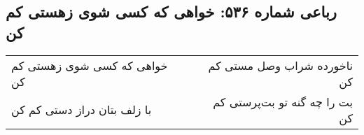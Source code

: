 \begin{center}
\section*{رباعی شماره ۵۳۶: خواهی که کسی شوی زهستی کم کن}
\label{sec:sh536}
\begin{longtable}{l p{0.5cm} r}
خواهی که کسی شوی زهستی کم کن
&&
ناخورده شراب وصل مستی کم کن
\\
با زلف بتان دراز دستی کم کن
&&
بت را چه گنه تو بت‌پرستی کم کن
\\
\end{longtable}
\end{center}

